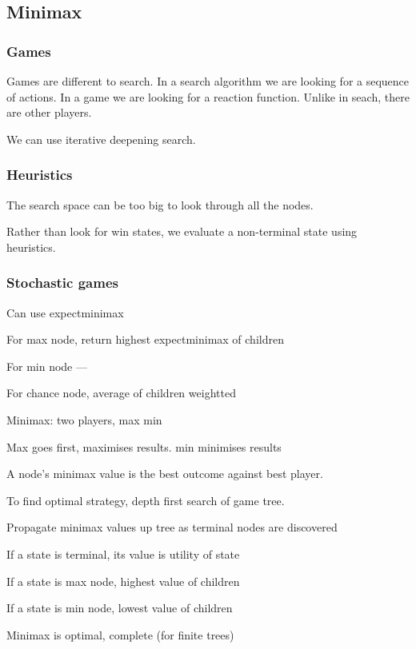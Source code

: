 
\subsection{Minimax}
\subsubsection{Games}

Games are different to search. In a search algorithm we are looking for a sequence of actions. In a game we are looking for a reaction function. Unlike in seach, there are other players.

We can use iterative deepening search.

\subsubsection{Heuristics}

The search space can be too big to look through all the nodes. 

Rather than look for win states, we evaluate a non-terminal state using heuristics.

\subsubsection{Stochastic games}

Can use expectminimax

For max node, return highest expectminimax of children

For min node ---

For chance node, average of children weightted

Minimax: two players, max min

Max goes first, maximises results. min minimises results

A node's minimax value is the best outcome against best player.

To find optimal strategy, depth first search of game tree.

Propagate minimax values up tree as terminal nodes are discovered

If a state is terminal, its value is utility of state

If a state is max node, highest value of children

If a state is min node, lowest value of children

Minimax is optimal, complete (for finite trees)

